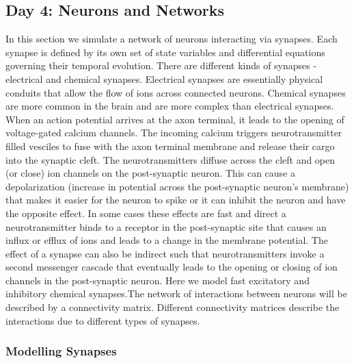\documentclass[10pt,letterpaper]{article}
\begin{document}
\begin{nolinenumbers}
\section*{Day 4: Neurons and Networks}
In this section we simulate a network of neurons interacting via synapses. Each synapse is defined by its own set of state variables and differential equations governing their temporal evolution. There are different kinds of synapses - electrical and chemical synapses. Electrical synapses are essentially physical conduits that allow the flow of ions across connected neurons. Chemical synapses are more common in the brain and are more complex than electrical synapses. When an action potential arrives at the axon terminal, it leads to the opening of voltage-gated calcium channels. The incoming calcium triggers neurotransmitter filled vesciles to fuse with the axon terminal membrane and release their cargo into the synaptic cleft. The neurotransmitters diffuse across the cleft and open (or close) ion channels on the post-synaptic neuron. This can cause a depolarization (increase in potential across the post-synaptic neuron's membrane) that makes it easier for the neuron to spike or it can inhibit the neuron and have the opposite effect. In some cases these effects are fast and direct \textemdash a neurotransmitter binds to a receptor in the post-synaptic site that causes an influx or efflux of ions and leads to a change in the membrane potential. The effect of a synapse can also be indirect such that neurotransmitters invoke a second messenger cascade that eventually leads to the opening or closing of ion channels in the post-synaptic neuron. Here we model fast excitatory and inhibitory chemical synapses.The network of interactions between neurons will be described by a connectivity matrix. Different connectivity matrices describe the interactions due to different types of synapses. 

\subsubsection*{Modelling Synapses}


\end{nolinenumbers}
\end{document}

